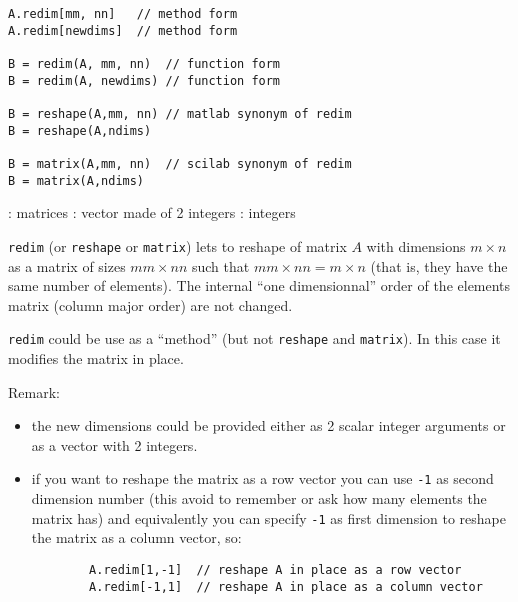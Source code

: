 
\begin{mandesc}
   \\
   \\
\end{mandesc}
\begin{calling_sequence}
\begin{verbatim}
A.redim[mm, nn]   // method form
A.redim[newdims]  // method form

B = redim(A, mm, nn)  // function form
B = redim(A, newdims) // function form

B = reshape(A,mm, nn) // matlab synonym of redim
B = reshape(A,ndims)

B = matrix(A,mm, nn)  // scilab synonym of redim
B = matrix(A,ndims)
\end{verbatim}
\end{calling_sequence}

\begin{parameters}
  \begin{varlist}
    : matrices
    :  vector made of 2 integers
    : integers
  \end{varlist}
\end{parameters}

\begin{mandescription}
\verb+redim+  (or \verb+reshape+ or \verb+matrix+) lets to reshape of matrix $A$ with dimensions
$m \times n$ as a matrix of sizes $mm \times nn$ such that 
$mm \times nn = m \times n$ (that is, they have the same number of elements).
The internal ``one dimensionnal'' order of the elements matrix (column major order) are 
not changed. 

\verb+redim+ could be use as a ``method'' (but not \verb+reshape+ and \verb+matrix+). In this case it 
modifies the matrix in place.

Remark:
\begin{itemize}
  \item the new dimensions could be provided either as 2 scalar integer arguments or as a vector with 2 integers.
  \item if you want to reshape the matrix as a row vector you can use \verb+-1+ as second dimension number (this
        avoid to remember or ask how many elements the matrix has) and equivalently you can specify \verb+-1+ as 
        first dimension to reshape the matrix as a column vector, so:
        \begin{verbatim}
        A.redim[1,-1]  // reshape A in place as a row vector
        A.redim[-1,1]  // reshape A in place as a column vector
        \end{verbatim}
\end{itemize}

\end{mandescription}

